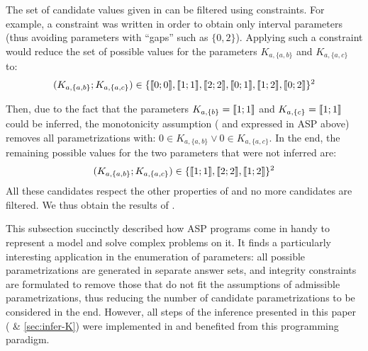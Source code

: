 \begin{example}
The set of candidate values given in  can be filtered using constraints.
For example, a constraint was written in order to obtain only interval parameters
(thus avoiding parameters with “gaps” such as $\{ 0, 2 \}$).
Applying such a constraint would reduce the set of possible values for the parameters $K_{a,\{a,b\}}$ and $K_{a,\{a,c\}}$ to:
\begin{align*}
  (K_{a,\{a,b\}} ; K_{a,\{a,c\}}) \in \{ \llbracket 0 ; 0 \rrbracket , \llbracket 1 ; 1 \rrbracket , \llbracket 2 ; 2 \rrbracket , \llbracket 0 ; 1 \rrbracket , \llbracket 1 ; 2 \rrbracket , \llbracket 0 ; 2 \rrbracket \}^2
\end{align*}

Then, due to the fact that the parameters $K_{a,\{b\}} = \llbracket 1 ; 1 \rrbracket$ and $K_{a,\{c\}} = \llbracket 1 ; 1 \rrbracket$ could be inferred,
the monotonicity assumption ( and expressed in ASP above) removes all parametrizations with:
$0 \in K_{a,\{a,b\}} \vee 0 \in K_{a,\{a,c\}}$.
In the end, the remaining possible values for the two parameters that were not inferred are:
\begin{align*}
  (K_{a,\{a,b\}} ; K_{a,\{a,c\}}) \in \{ \llbracket 1 ; 1 \rrbracket , \llbracket 2 ; 2 \rrbracket , \llbracket 1 ; 2 \rrbracket \}^2
\end{align*}
All these candidates respect the other properties of  and no more candidates are filtered.
We thus obtain the results of .
\end{example}



\medskip

This subsection succinctly described how ASP programs come in handy to represent a model and solve complex problems on it.
It finds a particularly interesting application in the enumeration of parameters:
all possible parametrizations are generated in separate answer sets,
and integrity constraints are formulated to remove those that do not fit the assumptions of admissible parametrizations,
thus reducing the number of candidate parametrizations to be considered in the end.
However, all steps of the inference presented in this paper ( \& \ref{sec:infer-K})
were implemented in and benefited from this programming paradigm.
